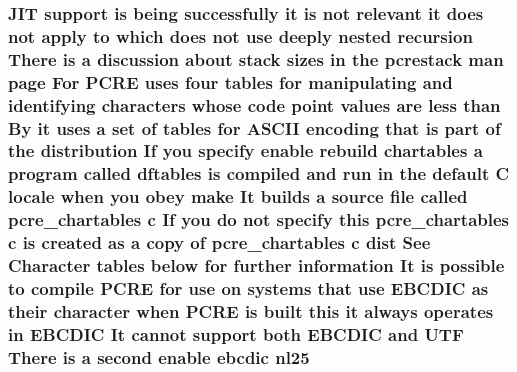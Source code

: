 \subsubsection[{\texorpdfstring{nl25}{nl25}}]{ J\+IT {\bf support} {\bf is} being successfully {\bf it} {\bf is} {\bf not} relevant {\bf it} does {\bf not} apply {\bf to} {\bf which} does {\bf not} use deeply nested {\bf recursion} There {\bf is} {\bf a} discussion about {\bf stack} sizes {\bf in} the pcrestack {\bf man} page For {\bf P\+C\+RE} uses four {\bf tables} for manipulating and identifying {\bf characters} whose {\bf code} {\bf point} {\bf values} {\bf are} less {\bf than} By {\bf it} uses {\bf a} {\bf set} {\bf of} {\bf tables} for {\bf A\+S\+C\+II} {\bf encoding} that {\bf is} part {\bf of} the distribution If you specify enable rebuild {\bf chartables} {\bf a} {\bf program} called {\bf dftables} {\bf is} {\bf compiled} and {\bf run} {\bf in} the {\bf default} {\bf C} {\bf locale} when you obey {\bf make} It builds {\bf a} {\bf source} {\bf file} called pcre\+\_\+chartables {\bf c} If you {\bf do} {\bf not} specify {\bf this} pcre\+\_\+chartables {\bf c} {\bf is} created {\bf as} {\bf a} copy {\bf of} pcre\+\_\+chartables {\bf c} {\bf dist} See Character {\bf tables} {\bf below} for further information It {\bf is} {\bf possible} {\bf to} {\bf compile} {\bf P\+C\+RE} for use {\bf on} {\bf systems} that use E\+B\+C\+D\+IC {\bf as} their {\bf character} when {\bf P\+C\+RE} {\bf is} {\bf built} {\bf this} {\bf it} always operates {\bf in} E\+B\+C\+D\+IC It cannot {\bf support} both E\+B\+C\+D\+IC and U\+TF There {\bf is} {\bf a} {\bf second} enable ebcdic nl25}\hypertarget{README_8txt_a8fbf9f170443f841b602227fe6ddd850}{}\label{README_8txt_a8fbf9f170443f841b602227fe6ddd850}
